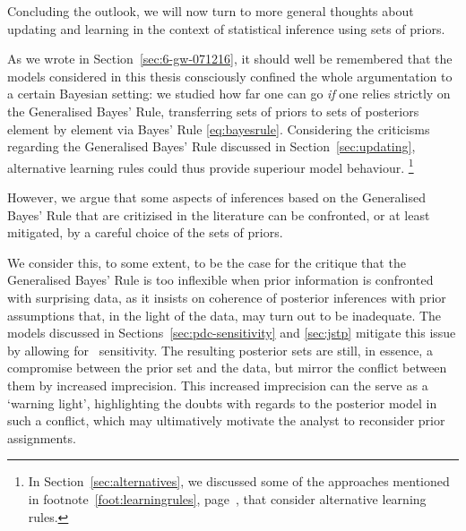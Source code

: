 \medskip

Concluding the outlook, we will now turn to more general thoughts about updating and learning
in the context of statistical inference using sets of priors.


As we wrote in Section~\ref{sec:6-gw-071216},
it should well be remembered that the models considered in this thesis
consciously confined the whole argumentation to a certain Bayesian setting:
we studied how far one can go \emph{if} one relies strictly on the Generalised Bayes' Rule,
transferring sets of priors to sets of posteriors element by element via Bayes' Rule \eqref{eq:bayesrule}.
Considering the criticisms regarding the Generalised Bayes' Rule discussed in Section~\ref{sec:updating},
alternative learning rules could thus provide superiour model behaviour.%
\footnote{In Section~\ref{sec:alternatives}, we discussed some of the approaches
mentioned in footnote~\ref{foot:learningrules}, page~\pageref{foot:learningrules},
that consider alternative learning rules.}

However, we argue that some aspects of inferences based on the Generalised Bayes' Rule that are critizised
in the literature
can be confronted, or at least mitigated, by a careful choice of the sets of priors.

We consider this, to some extent, to be the case for the critique that 
the Generalised Bayes' Rule is too inflexible when prior information is confronted with surprising data,
as it insists on coherence of posterior inferences with prior assumptions that,
in the light of the data, may turn out to be inadequate.
The models discussed in Sections~\ref{sec:pdc-sensitivity} and \ref{sec:jstp}
mitigate this issue by allowing for \pdc\ sensitivity.
The resulting posterior sets are still, in essence, a compromise between the prior set and the data,
but mirror the conflict between them by increased imprecision.
This increased imprecision can the serve as a `warning light',
highlighting the doubts with regards to the posterior model in such a conflict,
which may ultimatively motivate the analyst to reconsider prior assignments.

